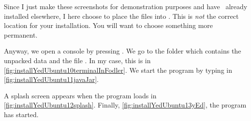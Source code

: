 Since I just make these screenshots for demonstration purposes and have \yEd\ already installed elsewhere, I here choose to place the files into .
This is \emph{not} the correct location for your installation.
You will want to choose something more permanent.

Anyway, we open a console by pressing \ubuntuTerminal.
We go to the folder which contains the unpacked data and the file .
In my case, this is  in \cref{fig:installYedUbuntu10terminalInFodler}.
We start the program by typing  in \cref{fig:installYedUbuntu11javaJar}.

A splash screen appears when the program loads in \cref{fig:installYedUbuntu12splash}.
Finally, \cref{fig:installYedUbuntu13yEd}, the program has started.%
%
\FloatBarrier%
\endhsection%
%
